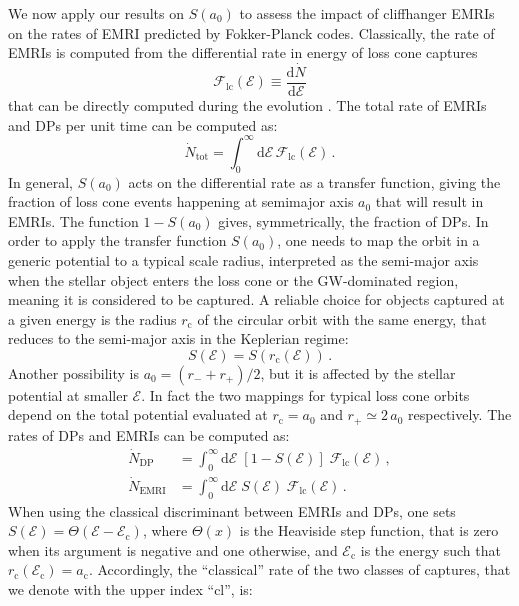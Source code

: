 \documentclass[desactivate]{aa}
\begin{document}
    
    We now apply our results on $S(a_0)$ to assess the impact of cliffhanger EMRIs on the rates of EMRI predicted by Fokker-Planck codes. Classically, the rate of EMRIs is computed from the differential rate in energy of loss cone captures
    \begin{equation}
        \mathcal{F}_\mathrm{lc}(\mathcal{E}) \equiv \frac{\mathrm{d} \dot{N}}{\mathrm{d}\mathcal{E}}
    \end{equation}
    that can be directly computed during the evolution \citep{1978ApJ...226.1087C}. The total rate of EMRIs and DPs per unit time can be computed as:
    \begin{equation}
        \dot{N}_\mathrm{tot} = \int_{0}^{\infty} \mathrm{d}\mathcal{E} \, \mathcal{F}_\mathrm{lc}(\mathcal{E})\,.
    \end{equation}
    In general, $S(a_0)$ acts on the differential rate as a transfer function, giving the fraction of loss cone events happening at semimajor axis $a_0$ that will result in EMRIs. The function $1-S(a_0)$ gives, symmetrically, the fraction of DPs.
    In order to apply the transfer function $S(a_0)$, one needs to map the orbit in a generic potential to a typical scale radius, interpreted as the semi-major axis when the stellar object enters the loss cone or the GW-dominated region, meaning it is considered to be captured. A reliable choice for objects captured at a given energy is the radius $r_\mathrm{c}$ of the circular orbit with the same energy, that reduces to the semi-major axis in the Keplerian regime:
    \begin{equation}
        S(\mathcal{E}) = S(r_\mathrm{c}(\mathcal{E})) \, .
    \end{equation}
    Another possibility is $a_0 = (r_- + r_+)/2$, but it is affected by the stellar potential at smaller $\mathcal{E}$. In fact the two mappings for typical loss cone orbits depend on the total potential evaluated at $r_\mathrm{c} = a_0$ and $r_+ \simeq 2\,a_0$ respectively.
    The rates of DPs and EMRIs can be computed as:
    \begin{align}\label{eq:newLCrates}
        \dot{N}_\mathrm{DP} &= \int_0^\infty \mathrm{d}\mathcal{E} \; \left[ 1 - S(\mathcal{E})\right]\; \mathcal{F}_\mathrm{lc}(\mathcal{E})\,,\\
        \dot{N}_\mathrm{EMRI} &= \int_0^\infty \mathrm{d}\mathcal{E} \; S(\mathcal{E}) \; \mathcal{F}_\mathrm{lc}(\mathcal{E}) \, .
    \end{align}
    When using the classical discriminant between EMRIs and DPs, one sets $S(\mathcal{E})  = \Theta(\mathcal{E} - \mathcal{E}_\mathrm{c})$, where $\Theta(x)$ is the Heaviside step function, that is zero when its argument is negative and one otherwise, and $\mathcal{E}_\mathrm{c}$ is the energy such that $r_\mathrm{c}(\mathcal{E}_\mathrm{c})=a_\mathrm{c}$. Accordingly, the ``classical'' rate of the two classes of captures, that we denote with the upper index ``cl'', is:
\end{document}
